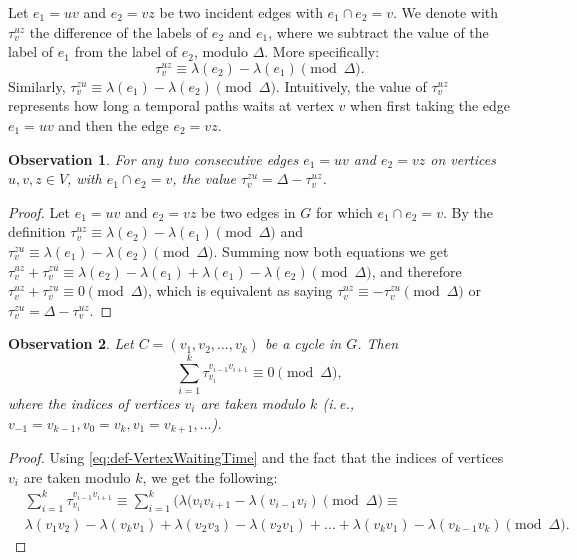 \documentclass[11pt,a4paper]{article}
\newtheorem{observation}{Observation}
\theoremstyle{remark}
\theoremstyle{definition}
\newcommand{\ie}{i.\,e.,\ }
\begin{document}
    Let $e_1=uv$ and $e_2=vz$ be two incident edges with $e_1 \cap e_2 = v$.
    We denote with $\tau_v^{uz}$ the difference of the labels of $e_2$ and $e_1$, where we subtract the value of the label of $e_1$ from the label of $e_2$,  modulo $\Delta$.
    More specifically:
    \begin{equation}\label{eq:def-VertexWaitingTime}
       \tau_v^{uz} \equiv \lambda (e_2) - \lambda(e_1) \pmod \Delta.
    \end{equation}
    Similarly, $\tau_v^{zu} \equiv \lambda (e_1) - \lambda(e_2) \pmod \Delta$.
    Intuitively, the value of $\tau_v^{uz}$ represents how long a temporal paths waits at vertex $v$ when first taking the edge $e_1=uv$ and then the edge $e_2 = vz$.
    
    \begin{observation}
    For any two consecutive edges $e_1 = uv$ and $e_2 = vz$ on vertices $u,v,z \in V$, with $e_1 \cap e_2 = v$, the value $\tau_v^{zu} = \Delta - \tau_v^{uz}$.
    \end{observation}
    
    \begin{proof}
        Let $e_1 = uv$ and $e_2 = vz$ be two edges in $G$ for which $e_1 \cap e_2 = v$. 
        By the definition $\tau_v^{uz} \equiv \lambda (e_2) - \lambda(e_1) \pmod \Delta$ and $\tau_v^{zu} \equiv \lambda (e_1) - \lambda(e_2) \pmod \Delta$.
        Summing now both equations we get $\tau_v^{uz} + \tau_v^{zu} \equiv \lambda(e_2) - \lambda(e_1) + \lambda (e_1) - \lambda(e_2) \pmod \Delta$, and therefore $\tau_v^{uz} + \tau_v^{zu} \equiv 0 \pmod \Delta$, which is equivalent as saying $\tau_v^{uz} \equiv - \tau_v^{zu} \pmod \Delta$ or $\tau_v^{zu} = \Delta - \tau_v^{uz}$.
    \end{proof}

    \begin{observation} \label{obs:exact-CyclesSum}
    Let $C = (v_1, v_2, \dots, v_k)$ be a cycle in $G$.
    Then 
    \begin{equation*}
        \sum_{i = 1}^k \tau_{v_i}^{v_{i-1}v_{i+1}} \equiv  0 \pmod \Delta,
    \end{equation*}
    where the indices of vertices $v_i$ are taken modulo $k$ (\ie $v_{-1}=v_{k-1}, v_0 = v_k, v_1 = v_{k+1}, \dots$).
    \end{observation}
    
    
    \begin{proof}
        Using \cref{eq:def-VertexWaitingTime} and the fact that the indices of vertices $v_i$ are taken modulo $k$, we get the following:
        \begin{align*}
            &\sum_{i = 1}^k \tau_{v_i}^{v_{i-1}v_{i+1}}  \equiv  \sum_{i = 1}^k  (\lambda(v_i v_{i+1} - \lambda (v_{i-1} v_i) \pmod \Delta \equiv \\
            &\lambda(v_1 v_2) - \lambda(v_{k}v_1) + \lambda(v_2 v_3) - \lambda(v_2 v_1) + \dots + \lambda(v_k v_1) - \lambda(v_{k-1}v_k) \pmod \Delta.
        \end{align*}
        
    \end{proof}
    
\end{document}
